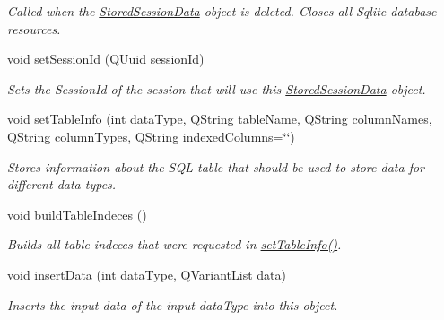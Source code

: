 \begin{DoxyCompactItemize}
\begin{DoxyCompactList}\small\item\em Called when the \hyperlink{class_stored_session_data}{Stored\-Session\-Data} object is deleted. Closes all Sqlite database resources. \end{DoxyCompactList}\item 
void \hyperlink{class_stored_session_data_a7c5b3706fb59f7e63e4cf56a47c7de01}{set\-Session\-Id} (Q\-Uuid session\-Id)
\begin{DoxyCompactList}\small\item\em Sets the Session\-Id of the session that will use this \hyperlink{class_stored_session_data}{Stored\-Session\-Data} object. \end{DoxyCompactList}\item 
void \hyperlink{class_stored_session_data_a4e05e7d7c7bcffe7d0ab20baac3ff115}{set\-Table\-Info} (int data\-Type, Q\-String table\-Name, Q\-String column\-Names, Q\-String column\-Types, Q\-String indexed\-Columns=\char`\"{}\char`\"{})
\begin{DoxyCompactList}\small\item\em Stores information about the S\-Q\-L table that should be used to store data for different data types. \end{DoxyCompactList}\item 
void \hyperlink{class_stored_session_data_ab187a23f5736693963806ea948fb5abf}{build\-Table\-Indeces} ()
\begin{DoxyCompactList}\small\item\em Builds all table indeces that were requested in \hyperlink{class_stored_session_data_a4e05e7d7c7bcffe7d0ab20baac3ff115}{set\-Table\-Info()}. \end{DoxyCompactList}\item 
void \hyperlink{class_stored_session_data_a97072a76c46132af05e9f49c6862817c}{insert\-Data} (int data\-Type, Q\-Variant\-List data)
\begin{DoxyCompactList}\small\item\em Inserts the input data of the input data\-Type into this object. \end{DoxyCompactList}\end{DoxyCompactItemize}
